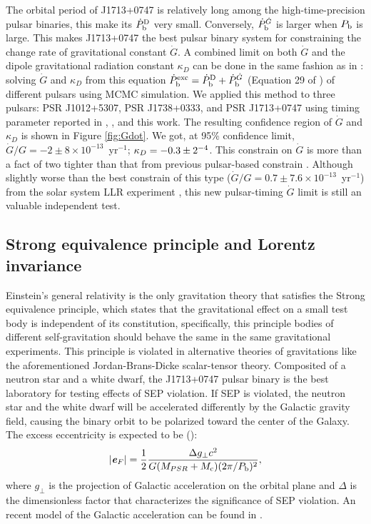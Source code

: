 The orbital period of J1713+0747 is relatively long among the
high-time-precision pulsar binaries, this make its $\dot{P}_{\rm b}^{\rm D}$
very small. Conversely, $\dot{P}_{\rm b}^{\dot{G}}$ is larger when $P_{\rm b}$
is large. This makes J1713+0747 the best pulsar binary system for constraining
the change rate of gravitational constant $\dot{G}$. A combined limit on both
$\dot{G}$ and the dipole gravitational radiation constant $\kappa_D$ can be
done in the same fashion as in \citet{lwj+09}: solving $\dot{G}$ and $\kappa_D$
from this equation $\dot{P}_{\rm b}^{\rm exc} = \dot{P}_{\rm b}^{\rm D} +
\dot{P}_{\rm b}^{\dot{G}}$ (Equation 29 of \citealt{lwj+09}) of different
pulsars using MCMC simulation. We applied this method to three pulsars: PSR J1012+5307, PSR
J1738+0333, and PSR J1713+0747 using timing parameter reported in
\citet{lwj+09}, \citet{fwe+12}, and this work.
The resulting confidence region of $\dot{G}$ and $\kappa_D$ is shown in Figure
\ref{fig:Gdot}.
We got, at 95\% confidence limit, $\dot{G}/G = -2\pm8\times10^{-13}$~yr$^{-1}$;
$\kappa_D=-0.3\pm2\time10^{-4}$. 
This constrain on $\dot{G}$ is more than a fact of two tighter than that from
previous pulsar-based constrain \citep{fwe+12}. 
Although slightly worse than
the best constrain of this type
($\dot{G}/G=0.7\pm7.6\times10^{-13}$~yr$^{-1}$) from the solar system LLR
experiment \citep{hmb10}, this new pulsar-timing  $\dot{G}$ limit is still an valuable independent test.  

\subsection{Strong equivalence principle and Lorentz invariance}
\label{sec:sep}
Einstein's general relativity is the only gravitation theory that satisfies
the Strong equivalence principle, which states that the gravitational
effect on a small test body is independent of its constitution, specifically,
this principle bodies of different self-gravitation should behave the same in
the same gravitational experiments. This principle is violated in alternative
theories of gravitations like the aforementioned Jordan-Brans-Dicke
scalar-tensor theory. Composited of a neutron star and a
white dwarf, the J1713+0747 pulsar binary is the best laboratory for testing 
effects of SEP violation. If SEP is violated, the neutron star and the white
dwarf will be accelerated differently by the Galactic gravity field, causing
the binary orbit to be polarized toward the center of the Galaxy. The excess 
eccentricity is expected to be (\citealt{ds91}):
\begin{equation}
|\textbf{\textit{e}}_F| = \frac{1}{2}\frac{\Delta g_{\bot} c^2}{G(M_{PSR}+M_{\rm
c})(2\pi/P_{\rm b})^2},
\end{equation}
where $g_{\bot}$ is the projection of Galactic acceleration on the orbital plane 
and $\Delta$ is the dimensionless factor that characterizes the significance 
of SEP violation. An recent model of the Galactic acceleration can be found in
\citealt{hf04a}.

